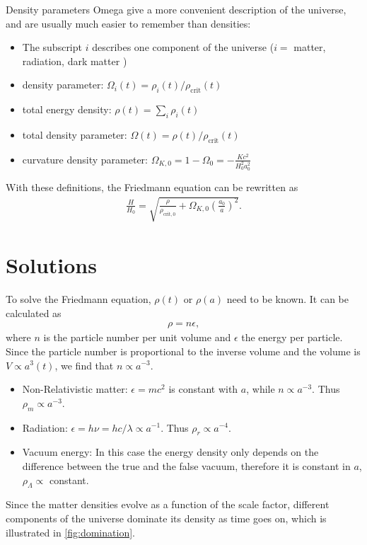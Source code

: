 Density parameters \gls{Omega} give a more convenient description of the universe, and are usually much easier to remember than densities:
\begin{itemize}
	\item The subscript $i$ describes one component of the universe ($i = $ matter, radiation, dark matter \textellipsis)
	\item density parameter: $\Omega_i(t) = \rho_i(t)/\rho_\text{crit}(t)$
	\item total energy density: $\rho(t) = \sum_{i} \rho_i(t)$
	\item total density parameter: $\Omega(t) = \rho(t)/\rho_\text{crit}(t)$
	\item curvature density parameter: $\Omega_{K,0} = 1 - \Omega_0 = - \frac{Kc^2}{H_0^2 a_0^2}$
\end{itemize}

With these definitions, the Friedmann equation can be rewritten as
\begin{align}
	\label{eq:friedmann-nice}
	\frac{H}{H_0} = \sqrt{\frac{\rho}{\rho_{\text{crit}, 0}} + \Omega_{K,0} \left( \frac{a_0}{a} \right)^2 }.
\end{align}




\section{Solutions}

To solve the Friedmann equation, $\rho(t)$ or $\rho(a)$ need to be known. It can be calculated as
\begin{align*}
	\rho = n \epsilon,
\end{align*}
where $n$ is the particle number per unit volume and $\epsilon$ the energy per particle. Since the particle number is proportional to the inverse volume and the volume is $V \propto a^3(t)$, we find that $n \propto a^{-3}$. 
\begin{itemize}
	\item Non-Relativistic matter: $\epsilon = mc^2$ is constant with $a$, while $n \propto a^{-3}$. Thus $\rho_m \propto a^{-3}$.
	\item Radiation: $\epsilon = h \nu = h c / \lambda \propto a^{-1}$. Thus $\rho_r \propto a^{-4}$.
	\item Vacuum energy: In this case the energy density only depends on the difference between the true and the false vacuum, therefore it is constant in $a$, $\rho_{\Lambda} \propto$ constant. 
\end{itemize}
Since the matter densities evolve as a function of the scale factor, different components of the universe dominate its density as time goes on, which is illustrated in \cref{fig:domination}.

